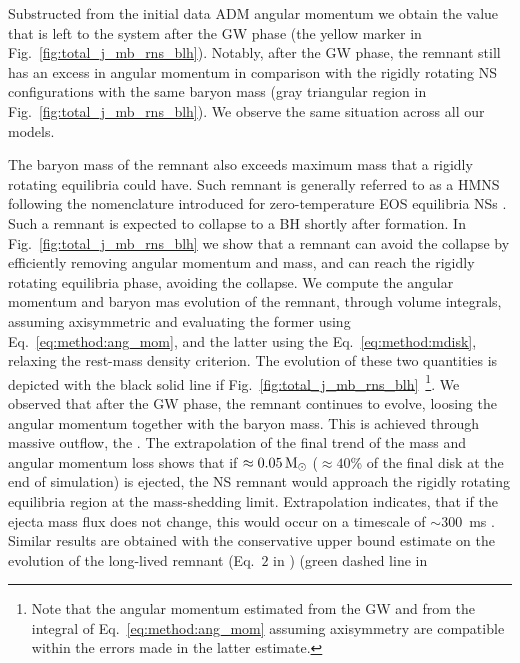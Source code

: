 %
Substructed from the initial data \ac{ADM} angular momentum %
we obtain the value that is left to the system after the \ac{GW} phase 
(the yellow marker in Fig.~\ref{fig:total_j_mb_rns_blh}).
%
Notably, after the \ac{GW} phase, the remnant still has an excess in angular momentum
in comparison with the rigidly rotating \ac{NS} configurations with the same baryon mass 
(gray triangular region in Fig.~\ref{fig:total_j_mb_rns_blh}).
%
We observe the same situation across all our models.%


The baryon mass of the remnant also exceeds maximum mass that a rigidly rotating 
equilibria could have. Such remnant is generally referred to as a \ac{HMNS} following the 
nomenclature introduced for zero-temperature \ac{EOS} equilibria \acp{NS} \citep{Baumgarte:1999cq}.
Such a remnant is expected to collapse to a \ac{BH} shortly after formation. 
In Fig.~\ref{fig:total_j_mb_rns_blh} we show that a remnant can avoid the collapse by 
efficiently removing angular momentum and mass, and can reach the rigidly rotating equilibria phase,
avoiding the collapse.
%
We compute the angular momentum and baryon mas evolution of the remnant, 
through volume integrals, assuming axisymmetric and evaluating the former using 
Eq.~\eqref{eq:method:ang_mom}, and the latter using the Eq.~\eqref{eq:method:mdisk},
relaxing the rest-mass density criterion. 
The evolution of these two quantities is depicted with the black solid line if 
Fig.~\eqref{fig:total_j_mb_rns_blh}~\footnote{
    Note that the angular momentum estimated
    from the \ac{GW} and from the integral of Eq.~\eqref{eq:method:ang_mom} assuming
    axisymmetry are compatible within the errors made in the latter estimate.
}.
%
We observed that after the \ac{GW} phase, the remnant continues to evolve, loosing the 
angular momentum together with the baryon mass. This is achieved through massive outflow,
the \swind{}. 
%
The extrapolation of the final trend of the mass and angular momentum loss shows that 
if $\approx0.05\,{\text{M}_{\odot}}$ ($\approx40$\% of the final disk at the end of simulation) is 
ejected, the \ac{NS} remnant would approach the rigidly rotating equilibria region 
at the mass-shedding limit. Extrapolation indicates, that if the ejecta mass flux does 
not change, this would occur on a timescale of $\sim 300$~ms \pmerg{}.
%
Similar results are obtained with the conservative upper bound estimate on the 
evolution of the long-lived remnant (Eq.~$2$ in \citet{Radice:2018xqa}) (green dashed line in 
